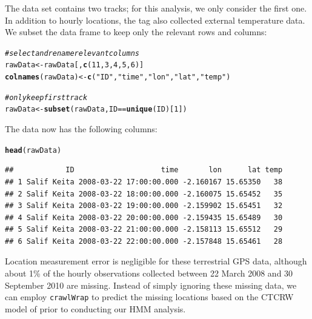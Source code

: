 \documentclass[12pt]{article}\usepackage[]{graphicx}\usepackage[]{xcolor}
\makeatletter
\newcommand{\hlnum}[1]{\textcolor[rgb]{0.686,0.059,0.569}{#1}}%
\newcommand{\hlsng}[1]{\textcolor[rgb]{0.192,0.494,0.8}{#1}}%
\newcommand{\hlcom}[1]{\textcolor[rgb]{0.678,0.584,0.686}{\textit{#1}}}%
\newcommand{\hlopt}[1]{\textcolor[rgb]{0,0,0}{#1}}%
\newcommand{\hldef}[1]{\textcolor[rgb]{0.345,0.345,0.345}{#1}}%
\newcommand{\hlkwb}[1]{\textcolor[rgb]{0.69,0.353,0.396}{#1}}%
\newcommand{\hlkwd}[1]{\textcolor[rgb]{0.737,0.353,0.396}{\textbf{#1}}}%
\newenvironment{kframe}{%
 \def\at@end@of@kframe{}%
 \ifinner\ifhmode%
  \def\at@end@of@kframe{\end{minipage}}%
  \begin{minipage}{\columnwidth}%
 \fi\fi%
 \def\FrameCommand##1{\hskip\@totalleftmargin \hskip-\fboxsep
 \colorbox{shadecolor}{##1}\hskip-\fboxsep
     \hskip-\linewidth \hskip-\@totalleftmargin \hskip\columnwidth}%
 \MakeFramed {\advance\hsize-\width
   \@totalleftmargin\z@ \linewidth\hsize
   \@setminipage}}%
 {\par\unskip\endMakeFramed%
 \at@end@of@kframe}
\newenvironment{knitrout}{}{} %
\makeatother
\begin{document}
The data set contains two tracks; for this analysis, we only consider the first one. In addition to hourly locations, the tag also collected external temperature data. We subset the data frame to keep only the relevant rows and columns:
\begin{knitrout}
\color{fgcolor}\begin{kframe}
\begin{alltt}
\hlcom{# select and rename relevant columns}
\hldef{rawData} \hlkwb{<-} \hldef{rawData[,}\hlkwd{c}\hldef{(}\hlnum{11}\hldef{,}\hlnum{3}\hldef{,}\hlnum{4}\hldef{,}\hlnum{5}\hldef{,}\hlnum{6}\hldef{)]}
\hlkwd{colnames}\hldef{(rawData)} \hlkwb{<-} \hlkwd{c}\hldef{(}\hlsng{"ID"}\hldef{,}\hlsng{"time"}\hldef{,}\hlsng{"lon"}\hldef{,}\hlsng{"lat"}\hldef{,}\hlsng{"temp"}\hldef{)}

\hlcom{# only keep first track}
\hldef{rawData} \hlkwb{<-} \hlkwd{subset}\hldef{(rawData,ID}\hlopt{==}\hlkwd{unique}\hldef{(ID)[}\hlnum{1}\hldef{])}
\end{alltt}
\end{kframe}
\end{knitrout}

The data now has the following columns:
\begin{knitrout}
\color{fgcolor}\begin{kframe}
\begin{alltt}
\hlkwd{head}\hldef{(rawData)}
\end{alltt}
\begin{verbatim}
##            ID                    time       lon      lat temp
## 1 Salif Keita 2008-03-22 17:00:00.000 -2.160167 15.65350   38
## 2 Salif Keita 2008-03-22 18:00:00.000 -2.160075 15.65452   35
## 3 Salif Keita 2008-03-22 19:00:00.000 -2.159902 15.65451   32
## 4 Salif Keita 2008-03-22 20:00:00.000 -2.159435 15.65489   30
## 5 Salif Keita 2008-03-22 21:00:00.000 -2.158113 15.65512   29
## 6 Salif Keita 2008-03-22 22:00:00.000 -2.157848 15.65461   28
\end{verbatim}
\end{kframe}
\end{knitrout}

Location measurement error is negligible for these terrestrial GPS data, although about 1\% of the hourly observations collected between 22 March 2008 and 30 September 2010 are missing. Instead of simply ignoring these missing data, we can employ \verb|crawlWrap| to predict the missing locations based on the CTCRW model of \cite{JohnsonEtAl2008} prior to conducting our HMM analysis.
\end{document}
